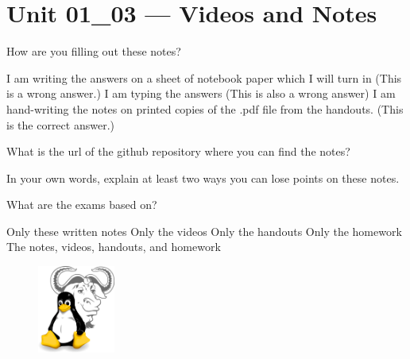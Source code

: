 \documentclass[letterpaper,12pt]{exam}
\begin{document}
\section*{Unit 01\_03 --- Videos and Notes} %

\begin{questions}
\question How are you filling out these notes?
\begin{checkboxes}
\choice I am writing the answers on a sheet of notebook paper which I will turn in (This is a wrong answer.)
\choice I am typing the answers (This is also a wrong answer)
\choice I am hand-writing the notes on printed copies of the .pdf file from the handouts. (This is the correct answer.)
\end{checkboxes}

\question What is the url of the github repository where you can find the notes? 
\vspace{.75cm}

\question In your own words, explain at least two ways you can lose points on these notes. 
\vspace{1.5cm}

\question What are the exams based on?
\begin{checkboxes}
\choice Only these written notes
\choice Only the videos
\choice Only the handouts
\choice Only the homework
\choice The notes, videos, handouts, and homework
\end{checkboxes}

\end{questions}

\begin{figure}[b]\label{end}
	\center
	\includegraphics[width=1in]{tux}
	{}
\end{figure}
\end{document}
